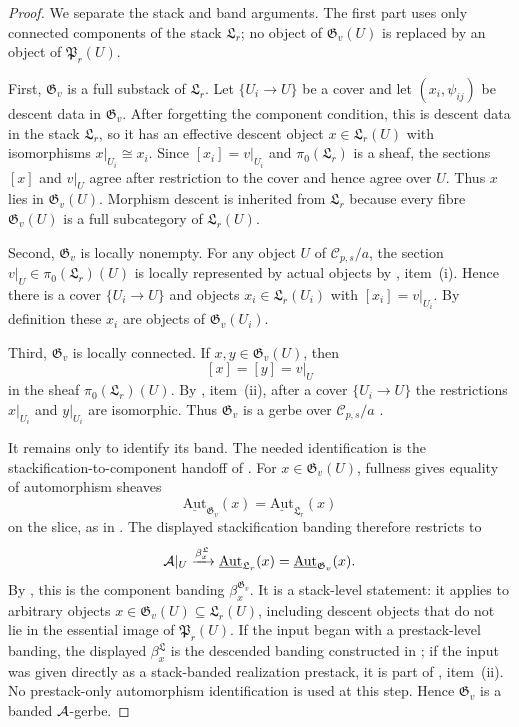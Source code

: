 \begin{proof}
We separate the stack and band arguments. The first part uses only connected
components of the stack $\mathfrak L_r$; no object of $\mathfrak G_v(U)$ is
replaced by an object of $\mathfrak P_r(U)$.

First, $\mathfrak G_v$ is a full substack of $\mathfrak L_r$. Let
$\{U_i\to U\}$ be a cover and let $(x_i,\psi_{ij})$ be descent data in
$\mathfrak G_v$. After forgetting the component condition, this is descent data
in the stack $\mathfrak L_r$, so it has an effective descent object
$x\in\mathfrak L_r(U)$ with isomorphisms $x|_{U_i}\cong x_i$. Since
$[x_i]=v|_{U_i}$ and $\pi_0(\mathfrak L_r)$ is a sheaf, the sections
$[x]$ and $v|_U$ agree after restriction to the cover and hence agree over $U$.
Thus $x$ lies in $\mathfrak G_v(U)$. Morphism descent is inherited from
$\mathfrak L_r$ because every fibre $\mathfrak G_v(U)$ is a full subcategory of
$\mathfrak L_r(U)$.

Second, $\mathfrak G_v$ is locally nonempty. For any object $U$ of
$\mathcal C_{p,s}/a$, the section
$v|_U\in\pi_0(\mathfrak L_r)(U)$ is locally represented by actual objects by
, item~\textup{(i)}. Hence there is a cover
$\{U_i\to U\}$ and objects $x_i\in\mathfrak L_r(U_i)$ with
$[x_i]=v|_{U_i}$. By definition these $x_i$ are objects of
$\mathfrak G_v(U_i)$.

Third, $\mathfrak G_v$ is locally connected. If $x,y\in\mathfrak G_v(U)$, then
\[
[x]=[y]=v|_U
\]
in the sheaf $\pi_0(\mathfrak L_r)(U)$. By
, item~\textup{(ii)}, after a cover
$\{U_i\to U\}$ the restrictions $x|_{U_i}$ and $y|_{U_i}$ are isomorphic. Thus
$\mathfrak G_v$ is a gerbe over $\mathcal C_{p,s}/a$
\cite[Tag 06NY]{StacksProject}.

It remains only to identify its band. The needed identification is the
stackification-to-component handoff of
. For
$x\in\mathfrak G_v(U)$, fullness gives equality of automorphism sheaves
\[
\underline{\mathrm{Aut}}_{\mathfrak G_v}(x)
=
\underline{\mathrm{Aut}}_{\mathfrak L_r}(x)
\]
on the slice, as in . The displayed
stackification banding therefore restricts to
\[
\mathcal{A}|_U\xrightarrow{\beta^{\mathfrak L}_x}
\underline{\mathrm{Aut}}_{\mathfrak L_r}(x)
=
\underline{\mathrm{Aut}}_{\mathfrak G_v}(x).
\]
By , this is the component
banding $\beta^{\mathfrak G_v}_x$. It is a stack-level statement: it applies to
arbitrary objects $x\in\mathfrak G_v(U)\subseteq\mathfrak L_r(U)$, including
descent objects that do not lie in the essential image of $\mathfrak P_r(U)$. If
the input began with a prestack-level banding, the displayed
$\beta^{\mathfrak L}_x$ is the descended banding constructed in
; if the input was given directly as a
stack-banded realization prestack, it is part of
, item~\textup{(ii)}. No prestack-only automorphism
identification is used at this step. Hence $\mathfrak G_v$ is a banded
$\mathcal{A}$-gerbe.
\end{proof}

